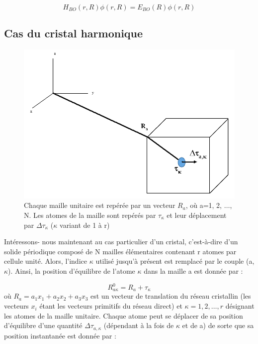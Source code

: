 \documentclass[12pt,a4paper]{book}
\begin{document}
\begin{equation}
H_{BO}(r,R)\phi(r,R) = E_{BO}(R)\phi(r,R)
\end{equation}

\subsection{Cas du cristal harmonique}

\begin{figure}[h]
	\centering
	\includegraphics[scale=0.7]{figsolid}
	\caption[Reperer des atomes de la maille par rapport l'axe de coordonnées]{Chaque maille unitaire est repérée par un vecteur $R_{a}$, où a=1, 2, $\dotsc$, N. Les atomes de la maille sont repérés par $\tau_{\kappa}$ et leur déplacement par $\Delta\tau_{\kappa}$ ($\kappa$ variant de 1 à r)}
\end{figure}

Intéressons- nous maintenant au cas particulier d'un cristal, c'est-à-dire d'un solide périodique composé de N mailles élémentaires contenant r atomes par cellule unité. Alors, l'indice $\kappa$ utilisé jusqu'à présent est remplacé par le couple (a,$\kappa$). Ainsi, la position d'équilibre de l'atome $\kappa$ dans la maille a est donnée par :

\begin{equation}
R_{a\kappa}^{0}= R_{a} + \tau_{\kappa}
\end{equation}
où $R_{a}=a_{1}x_{1} + a_{2}x_{2} + a_{3}x_{3}$ est un vecteur de translation du réseau cristallin (les vecteurs $x_{i}$ étant les vecteurs primitifs du réseau direct) et $\kappa = 1, 2,\ldots,r$ désignant les atomes de la maille unitaire. Chaque atome peut se déplacer de sa position d'équilibre d'une quantité $\Delta\tau_{a,\kappa}$ (dépendant à la fois de $\kappa$ et de a) de sorte que sa position instantanée est donnée par :
\end{document}
